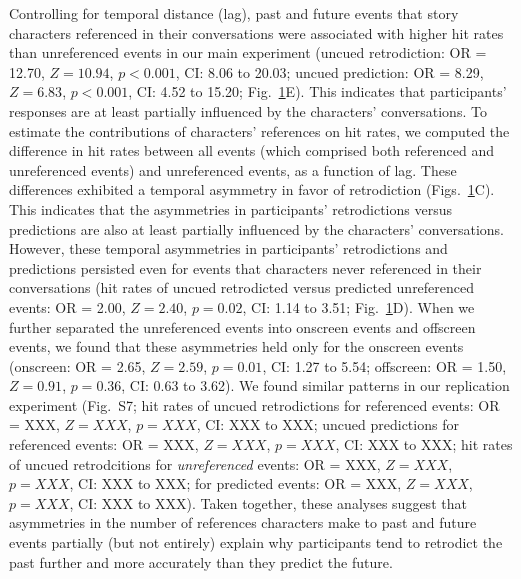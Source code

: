 \documentclass[10pt]{article}
\newcommand{\characterRefs}{S7}
\begin{document}
\begin{figure}[tp]
  \label{fig:result3}
\end{figure}

Controlling for temporal distance (lag), past and future events that story
characters referenced in their conversations were associated with higher hit
rates than unreferenced events in our main experiment (uncued retrodiction: OR
= 12.70, $Z = 10.94$, $p < 0.001$, CI: 8.06 to 20.03; uncued prediction: OR =
8.29, $Z = 6.83$, $p < 0.001$, CI: 4.52 to 15.20; Fig.~\ref{fig:result3}E).
This indicates that participants' responses are at least partially influenced
by the characters' conversations. To estimate the contributions of characters’
references on hit rates, we computed the difference in hit rates between all
events (which comprised both referenced and unreferenced events) and
unreferenced events, as a function of lag. These differences exhibited a
temporal asymmetry in favor of retrodiction (Figs.~\ref{fig:result3}C). This
indicates that the asymmetries in participants' retrodictions versus
predictions are also at least partially influenced by the characters'
conversations. However, these temporal asymmetries in participants'
retrodictions and predictions persisted even for events that characters never
referenced in their conversations (hit rates of uncued retrodicted versus
predicted unreferenced events: OR = 2.00, $Z = 2.40$, $p = 0.02$, CI: 1.14 to
3.51; Fig.~\ref{fig:result3}D). When we further separated the unreferenced
events into onscreen events and offscreen events, we found that these
asymmetries held only for the onscreen events (onscreen: OR = 2.65, $Z = 2.59$,
$p = 0.01$, CI: 1.27 to 5.54; offscreen: OR = 1.50, $Z = 0.91$, $p = 0.36$, CI:
0.63 to 3.62). We found similar patterns in our replication experiment
(Fig.~\characterRefs; hit rates of uncued retrodictions for referenced events:
OR = XXX, $Z = XXX$, $p = XXX$, CI: XXX to XXX; uncued predictions for
referenced events: OR = XXX, $Z = XXX$, $p = XXX$, CI: XXX to XXX; hit rates of
uncued retrodcitions for \textit{unreferenced} events: OR = XXX, $Z = XXX$, $p
= XXX$, CI: XXX to XXX; for predicted events: OR = XXX, $Z = XXX$, $p = XXX$,
CI: XXX to XXX). Taken together, these analyses suggest that asymmetries in the
number of references characters make to past and future events partially (but
not entirely) explain why participants tend to retrodict the past further and
more accurately than they predict the future.
\end{document}
